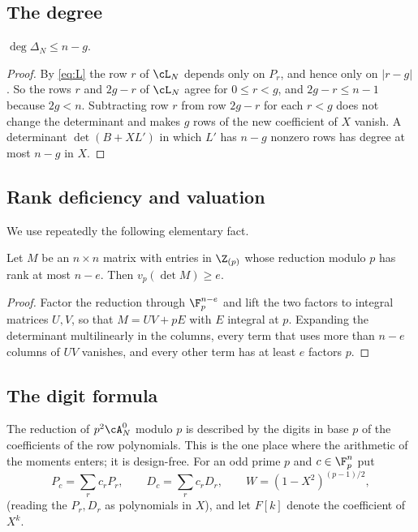\subsection{The degree}
\begin{lemma}\label{lem:degree}
$\deg\Delta_N\le n-g$.
\end{lemma}

\begin{proof}
By \eqref{eq:L} the row $r$ of $\cL_N$ depends only on $P_r$, and hence only on $|r-g|$. So the rows
$r$ and $2g-r$ of $\cL_N$ agree for $0\le r<g$, and $2g-r\le n-1$ because $2g<n$. Subtracting row $r$ from
row $2g-r$ for each $r<g$ does not change the determinant and makes $g$ rows of the new coefficient of
$X$ vanish. A determinant $\det(B+XL')$ in which $L'$ has $n-g$ nonzero rows has degree at most $n-g$ in $X$.
\end{proof}

\subsection{Rank deficiency and valuation}
We use repeatedly the following elementary fact.

\begin{lemma}\label{lem:rank-valuation}
Let $M$ be an $n\times n$ matrix with entries in $\Z_{(p)}$ whose reduction modulo $p$ has rank at most
$n-e$. Then $v_p(\det M)\ge e$.
\end{lemma}

\begin{proof}
Factor the reduction through $\F_p^{n-e}$ and lift the two factors to integral matrices $U,V$, so that
$M=UV+pE$ with $E$ integral at $p$. Expanding the determinant multilinearly in the columns, every term
that uses more than $n-e$ columns of $UV$ vanishes, and every other term has at least $e$ factors $p$.
\end{proof}

\subsection{The digit formula}
The reduction of $p^2\cA^0_N$ modulo $p$ is described by the digits in base $p$ of the coefficients of the
row polynomials. This is the one place where the arithmetic of the moments enters; it is design-free.
For an odd prime $p$ and $c\in\F_p^n$ put
\[
 P_c=\sum_rc_rP_r,\qquad D_c=\sum_rc_rD_r,\qquad W=(1-X^2)^{(p-1)/2},
\]
(reading the $P_r,D_r$ as polynomials in $X$), and let $F[k]$ denote the coefficient of $X^k$.


